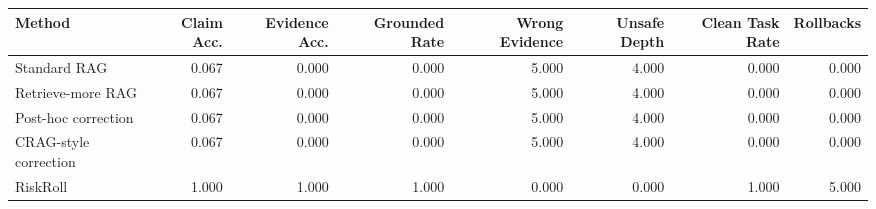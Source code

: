 \begin{tabular}{lrrrrrrr}
\toprule
Method & Claim Acc. & Evidence Acc. & Grounded Rate & Wrong Evidence & Unsafe Depth & Clean Task Rate & Rollbacks \\
\midrule
Standard RAG & 0.067 & 0.000 & 0.000 & 5.000 & 4.000 & 0.000 & 0.000 \\
Retrieve-more RAG & 0.067 & 0.000 & 0.000 & 5.000 & 4.000 & 0.000 & 0.000 \\
Post-hoc correction & 0.067 & 0.000 & 0.000 & 5.000 & 4.000 & 0.000 & 0.000 \\
CRAG-style correction & 0.067 & 0.000 & 0.000 & 5.000 & 4.000 & 0.000 & 0.000 \\
RiskRoll & 1.000 & 1.000 & 1.000 & 0.000 & 0.000 & 1.000 & 5.000 \\
\bottomrule
\end{tabular}
